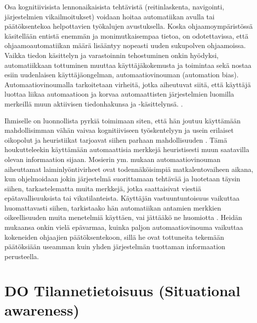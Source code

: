 \documentclass[utf8,bachelor,manualbib]{gradu3}
\begin{document}
Osa kognitiivisista lennonaikaisista tehtävistä (reitinlaskenta, navigointi, järjestelmien vikailmoitukset) voidaan hoitaa automatiikan avulla tai päätöksentekoa helpottavien työkalujen avustuksella. Koska ohjaamoympäristössä käsitellään entistä enemmän ja monimutkaisempaa tietoa, on odotettavissa, että ohjaamoautomatiikan määrä lisääntyy nopeasti uuden sukupolven ohjaamoissa. Vaikka tiedon käsittelyn ja varastoinnin tehostuminen onkin hyödyksi, automatiikkaan tottuminen muuttaa käyttäjäkokemusta ja toimintaa sekä nostaa esiin uudenlaisen käyttäjäongelman, automaatiovinouman (automation bias). Automaatiovinoumalla tarkoitetaan virheitä, jotka aiheutuvat siitä, että käyttäjä luottaa liikaa automaatioon ja korvaa automaattisten järjestelmien luomilla merkeillä muun aktiivisen tiedonhakunsa ja -käsittelynsä. \citep{mosierym1998}.

Ihmiselle on luonnollista pyrkiä toimimaan siten, että hän joutuu käyttämään mahdollisimman vähän vaivaa kognitiiviseen työskentelyyn ja usein erilaiset oikopolut ja heuristiikat tarjoavat siihen parhaan mahdollisuuden \citep{fisketaylor1994}. Tämä houkutteleekin käyttämään automaattisia merkkejä heuristisesti muun saatavilla olevan informaation sijaan. Mosierin ym. \citeyearpar{mosierym1994} mukaan automaatiovinouman aiheuttamat laiminlyöntivirheet ovat todennäköisimpiä matkalentovaiheen aikana, kun ohjelmoidaan jokin järjestelmä suorittamaan tehtävää ja luotetaan täysin siihen, tarkastelematta muita merkkejä, jotka saattaisivat viestiä epätavallisuuksista tai vikatilanteista. Käyttäjän vastuuntuntoisuus vaikuttaa huomattavasti siihen, tarkistaako hän automatiikan antamien merkkien oikeellisuuden muita menetelmiä käyttäen, vai jättääkö ne huomiotta \citep{mosierym1998}. Heidän mukaansa onkin vielä epävarmaa, kuinka paljon automaatiovinouma vaikuttaa kokeneiden ohjaajien päätöksentekoon, sillä he ovat tottuneita tekemään päätöksiään useamman kuin yhden järjestelmän tuottaman informaation perusteella.

\section{DO Tilannetietoisuus (Situational awareness)}
\end{document}
